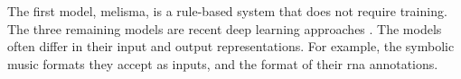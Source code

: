 
The first model, \gls{melisma}, is a rule-based system that
does not require training. The three remaining models are
recent deep learning approaches \parencite{chen2021attend,
micchi2021deep, mcleod2021modular}. The models often differ
in their input and output representations. For example, the
symbolic music formats they accept as inputs, and the format
of their \gls{rna} annotations. 
